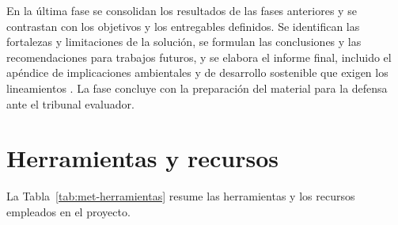 En la última fase se consolidan los resultados de las fases anteriores y se contrastan con los objetivos y los entregables definidos.
Se identifican las fortalezas y limitaciones de la solución, se formulan las conclusiones y las recomendaciones para trabajos futuros, y se elabora el informe final, incluido el apéndice de implicaciones ambientales y de desarrollo sostenible que exigen los lineamientos \cite{tec_lineamientos_tfg}.
La fase concluye con la preparación del material para la defensa ante el tribunal evaluador.

\section{Herramientas y recursos}
\label{sec:met-herramientas}

La Tabla~\ref{tab:met-herramientas} resume las herramientas y los recursos empleados en el proyecto.

